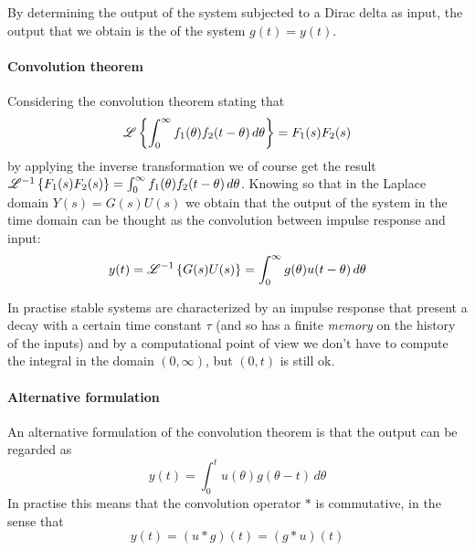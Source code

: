 		By determining the output of the system subjected to a Dirac delta as input, the output that we obtain is the  of the system $g(t) = y(t)$.
		
		\paragraph{Convolution theorem} Considering the convolution theorem stating that
		\begin{equation}
			\mathscr L \left\{  \int_0^\infty f_1(\theta) f_2(t-\theta)\, d\theta \right\} = F_1(s) F_2(s)
		\end{equation}
		by applying the inverse transformation we of course get the result
		$ \mathscr L^{-1} \left\{ F_1(s) F_2(s) \right\} = \int_0^\infty f_1(\theta) f_2(t-\theta)\, d\theta $.
		Knowing so that in the Laplace domain $Y(s) = G(s) U(s)$ we obtain that the output of the system in the time domain can be thought as the convolution between impulse response and input:
		\begin{equation}
			y(t) = \mathscr L^{-1} \left\{ G(s) U(s) \right\} = \int_0^\infty g(\theta)u(t-\theta) \, d\theta
		\end{equation}
		
		In practise stable systems are characterized by an impulse response that present a decay with a certain time constant $\tau$ (and so has a finite \textit{memory} on the history of the inputs) and by a computational point of view we don't have to compute the integral in the domain $(0,\infty)$, but $(0,t)$ is still ok.
		
		\paragraph{Alternative formulation} An alternative formulation of the convolution theorem is that the output can be regarded as
		\[ y(t) = \int_0^t u(\theta) g(\theta-t)\, d\theta \]
		In practise this means that the convolution operator $*$ is commutative, in the sense that
		\[ y(t) = (u*g)(t) = (g*u)(t) \]

